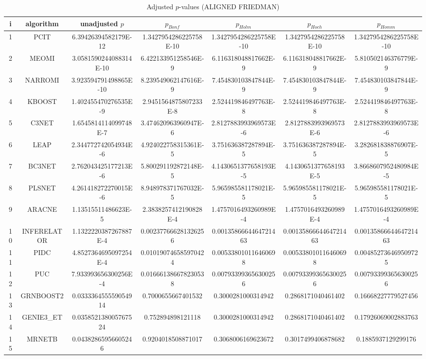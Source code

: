 \documentclass[a4paper,10pt]{article}
\begin{document}
\begin{landscape}
\begin{table}[!htp]
\centering\scriptsize
\caption{Adjusted $p$-values (ALIGNED FRIEDMAN)}
\begin{tabular}{ccccccc}
i&algorithm&unadjusted $p$&$p_{Bonf}$&$p_{Holm}$&$p_{Hoch}$&$p_{Homm}$\\
\hline
1&PCIT&6.39426394582179E-12&1.3427954286225758E-10&1.3427954286225758E-10&1.3427954286225758E-10&1.3427954286225758E-10\\
2&MEOMI&3.0581590244088314E-10&6.422133951258546E-9&6.116318048817662E-9&6.116318048817662E-9&5.810502146376779E-9\\
3&NARROMI&3.923594791498865E-10&8.239549062147616E-9&7.454830103847844E-9&7.454830103847844E-9&7.454830103847844E-9\\
4&KBOOST&1.402455470276535E-9&2.9451564875807233E-8&2.524419846497763E-8&2.524419846497763E-8&2.524419846497763E-8\\
5&C3NET&1.6545814114099748E-7&3.474620963960947E-6&2.8127883993969573E-6&2.8127883993969573E-6&2.8127883993969573E-6\\
6&LEAP&2.344772742054934E-6&4.924022758315361E-5&3.751636387287894E-5&3.751636387287894E-5&3.282681838876907E-5\\
7&BC3NET&2.762043425177213E-6&5.800291192872148E-5&4.1430651377658193E-5&4.1430651377658193E-5&3.8668607952480984E-5\\
8&PLSNET&4.261418272270015E-6&8.948978371767032E-5&5.965985581178021E-5&5.965985581178021E-5&5.965985581178021E-5\\
9&ARACNE&1.13515511486623E-5&2.3838257412190828E-4&1.4757016493260989E-4&1.4757016493260989E-4&1.4757016493260989E-4\\
10&INFERELATOR&1.1322220387267887E-4&0.002377666281326256&0.0013586664464721463&0.0013586664464721463&0.0013586664464721463\\
11&PIDC&4.8527364695097254E-4&0.010190746585970424&0.005338010116460698&0.005338010116460698&0.004852736469509725\\
12&PUC&7.933993656300256E-4&0.016661386678230538&0.007933993656300256&0.007933993656300256&0.007933993656300256\\
13&GRNBOOST2&0.033336455559054914&0.7000655667401532&0.3000281000314942&0.2868171040461402&0.16668227779527456\\
14&GENIE3_ET&0.035852138005767524&0.752894898121118&0.3000281000314942&0.2868171040461402&0.17926069002883763\\
15&MRNETB&0.04382865956605246&0.9204018508871017&0.3068006169623672&0.3017499406878682&0.1885937129299176\\

\end{tabular}
\end{table}
\end{landscape}
\end{document}
